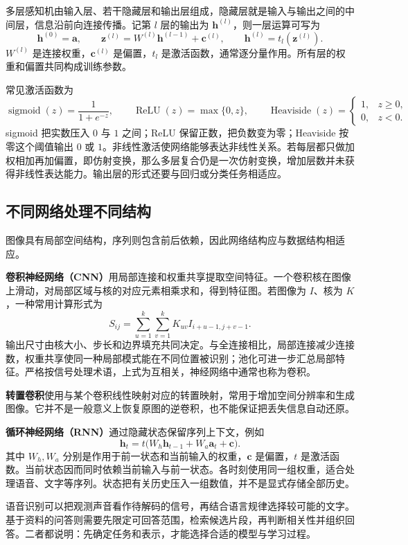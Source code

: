 \documentclass[UTF8,fontset=fandol,a4paper,12pt]{ctexart}
\newcommand{\va}{\boldsymbol a}
\theoremstyle{definition}
\begin{document}
多层感知机由输入层、若干隐藏层和输出层组成，隐藏层就是输入与输出之间的中间层，信息沿前向连接传播。记第 $l$ 层的输出为 $\boldsymbol h^{(l)}$，则一层运算可写为
\[
 \boldsymbol h^{(0)}=\va,\qquad
 \boldsymbol z^{(l)}=W^{(l)}\boldsymbol h^{(l-1)}+\boldsymbol c^{(l)},\qquad
 \boldsymbol h^{(l)}=t_l(\boldsymbol z^{(l)}).
\]
$W^{(l)}$ 是连接权重，$\boldsymbol c^{(l)}$ 是偏置，$t_l$ 是激活函数，通常逐分量作用。所有层的权重和偏置共同构成训练参数。

常见激活函数为
\[
 \operatorname{sigmoid}(z)=\frac1{1+e^{-z}},\qquad
 \operatorname{ReLU}(z)=\max\{0,z\},\qquad
 \operatorname{Heaviside}(z)=
 \begin{cases}1,&z\ge0,\\0,&z<0.\end{cases}
\]
sigmoid 把实数压入 $0$ 与 $1$ 之间；ReLU 保留正数，把负数变为零；Heaviside 按零这个阈值输出 $0$ 或 $1$。非线性激活使网络能够表达非线性关系。若每层都只做加权相加再加偏置，即仿射变换，那么多层复合仍是一次仿射变换，增加层数并未获得非线性表达能力。输出层的形式还要与回归或分类任务相适应。

\subsection{不同网络处理不同结构}
图像具有局部空间结构，序列则包含前后依赖，因此网络结构应与数据结构相适应。

\textbf{卷积神经网络（CNN）}用局部连接和权重共享提取空间特征。一个卷积核在图像上滑动，对局部区域与核的对应元素相乘求和，得到特征图。若图像为 $I$、核为 $K$，一种常用计算形式为
\[
 S_{ij}=\sum_{u=1}^k\sum_{v=1}^k K_{uv}I_{i+u-1,j+v-1}.
\]
输出尺寸由核大小、步长和边界填充共同决定。与全连接相比，局部连接减少连接数，权重共享使同一种局部模式能在不同位置被识别；池化可进一步汇总局部特征。严格按信号处理术语，上式为互相关，神经网络中通常也称为卷积。

\textbf{转置卷积}使用与某个卷积线性映射对应的转置映射，常用于增加空间分辨率和生成图像。它并不是一般意义上恢复原图的逆卷积，也不能保证把丢失信息自动还原。

\textbf{循环神经网络（RNN）}通过隐藏状态保留序列上下文，例如
\[
 \boldsymbol h_t=t\bigl(W_h\boldsymbol h_{t-1}+W_a\va_t+\boldsymbol c\bigr).
\]
其中 $W_h,W_a$ 分别是作用于前一状态和当前输入的权重，$\boldsymbol c$ 是偏置，$t$ 是激活函数。当前状态因而同时依赖当前输入与前一状态。各时刻使用同一组权重，适合处理语音、文字等序列。状态把有关历史压入一组数值，并不是显式存储全部历史。

语音识别可以把观测声音看作待解码的信号，再结合语言规律选择较可能的文字。基于资料的问答则需要先限定可回答范围，检索候选片段，再判断相关性并组织回答。二者都说明：先确定任务和表示，才能选择合适的模型与学习过程。
\end{document}
